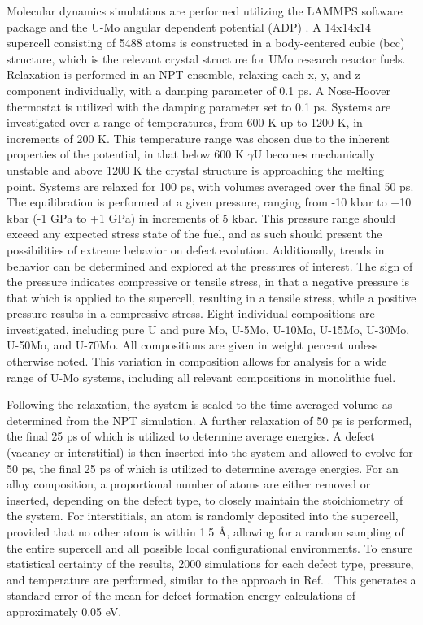 \documentclass[default]{sn-jnl}%
\begin{document}
Molecular dynamics simulations are performed utilizing the LAMMPS \cite{plimpton1995} software package and the U-Mo angular dependent potential (ADP) \cite{smirnovaADP}. A 14x14x14 supercell consisting of 5488 atoms is constructed in a body-centered cubic (bcc) structure, which is the relevant crystal structure for UMo research reactor fuels. Relaxation is performed in an NPT-ensemble, relaxing each x, y, and z component individually, with a damping parameter of 0.1 ps. A Nose-Hoover thermostat is utilized with the damping parameter set to 0.1 ps. Systems are investigated over a range of temperatures, from 600 K up to 1200 K, in increments of 200 K. This temperature range was chosen due to the inherent properties of the potential, in that below 600 K $\gamma$U becomes mechanically unstable and above 1200 K the crystal structure is approaching the melting point. Systems are relaxed for 100 ps, with volumes averaged over the final 50 ps. The equilibration is performed at a given pressure, ranging from -10 kbar to +10 kbar (-1 GPa to +1 GPa) in increments of 5 kbar. This pressure range should exceed any expected stress state of the fuel, and as such should present the possibilities of extreme behavior on defect evolution. Additionally, trends in behavior can be determined and explored at the pressures of interest. The sign of the pressure indicates compressive or tensile stress, in that a negative pressure is that which is applied to the supercell, resulting in a tensile stress, while a positive pressure results in a compressive stress. Eight individual compositions are investigated, including pure U and pure Mo, U-5Mo, U-10Mo, U-15Mo, U-30Mo, U-50Mo, and U-70Mo. All compositions are given in weight percent unless otherwise noted. This variation in composition allows for analysis for a wide range of U-Mo systems, including all relevant compositions in monolithic fuel.  

Following the relaxation, the system is scaled to the time-averaged volume as determined from the NPT simulation. A further relaxation of 50 ps is performed, the final 25 ps of which is utilized to determine average energies. A defect (vacancy or interstitial) is then inserted into the system and allowed to evolve for 50 ps, the final 25 ps of which is utilized to determine average energies. For an alloy composition, a proportional number of atoms are either removed or inserted, depending on the defect type, to closely maintain the stoichiometry of the system. For interstitials, an atom is randomly deposited into the supercell, provided that no other atom is within 1.5 \AA, allowing for a random sampling of the entire supercell and all possible local configurational environments. To ensure statistical certainty of the results, 2000 simulations for each defect type, pressure, and temperature are performed, similar to the approach in Ref. \cite{zhang2021}. This generates a standard error of the mean for defect formation energy calculations of approximately 0.05 eV. 
\end{document}
